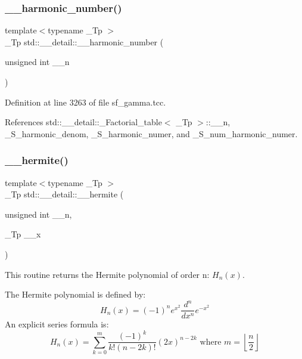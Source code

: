 \subsubsection{\texorpdfstring{\+\_\+\+\_\+harmonic\+\_\+number()}{\_\_harmonic\_number()}}
{\footnotesize\ttfamily template$<$typename \+\_\+\+Tp $>$ \\
\+\_\+\+Tp std\+::\+\_\+\+\_\+detail\+::\+\_\+\+\_\+harmonic\+\_\+number (\begin{DoxyParamCaption}\item[{unsigned int}]{\+\_\+\+\_\+n }\end{DoxyParamCaption})}



Definition at line 3263 of file sf\+\_\+gamma.\+tcc.



References std\+::\+\_\+\+\_\+detail\+::\+\_\+\+Factorial\+\_\+table$<$ \+\_\+\+Tp $>$\+::\+\_\+\+\_\+n, \+\_\+\+S\+\_\+harmonic\+\_\+denom, \+\_\+\+S\+\_\+harmonic\+\_\+numer, and \+\_\+\+S\+\_\+num\+\_\+harmonic\+\_\+numer.

\mbox{\label{namespacestd_1_1____detail_aeb57881dd224320629e184c9118c910b}} 
\subsubsection{\texorpdfstring{\+\_\+\+\_\+hermite()}{\_\_hermite()}}
{\footnotesize\ttfamily template$<$typename \+\_\+\+Tp $>$ \\
\+\_\+\+Tp std\+::\+\_\+\+\_\+detail\+::\+\_\+\+\_\+hermite (\begin{DoxyParamCaption}\item[{unsigned int}]{\+\_\+\+\_\+n,  }\item[{\+\_\+\+Tp}]{\+\_\+\+\_\+x }\end{DoxyParamCaption})}



This routine returns the Hermite polynomial of order n\+: $ H_n(x) $. 

The Hermite polynomial is defined by\+: \[ H_n(x) = (-1)^n e^{x^2} \frac{d^n}{dx^n} e^{-x^2} \] An explicit series formula is\+: \[ H_n(x) = \sum_{k=0}^{m} \frac{(-1)^k}{k!(n-2k)!}(2x)^{n-2k} \mbox{ where } m = \left\lfloor{\frac{n}{2}}\right\rfloor \]

